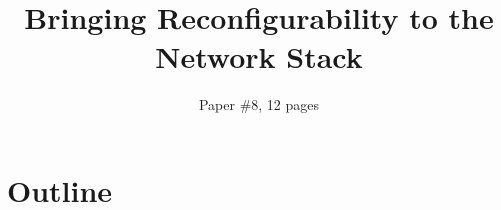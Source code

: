 \documentclass[letterpaper,twocolumn,10pt]{article}
\date{}
\begin{document}
\title{\LARGE Bringing Reconfigurability to the Network Stack}
\author{\large Paper \#8, 12 pages}
\maketitle


\sloppy
\section{Outline}

%




%
%
\label{p:end}
\newpage
%
 

\end{document}
